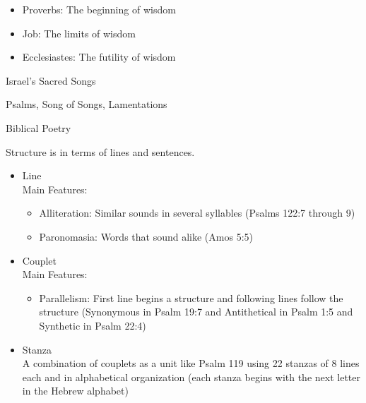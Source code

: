 \documentclass{article}
\begin{document}
    \begin{itemize}
        \item Proverbs: The beginning of wisdom
        \item Job: The limits of wisdom
        \item Ecclesiastes: The futility of wisdom
    \end{itemize}

    \centerline{Israel's Sacred Songs}

    Psalms, Song of Songs, Lamentations

    \centerline{Biblical Poetry}

    Structure is in terms of lines and sentences.

    \begin{itemize}
        \item Line \\
            Main Features: \\
                \begin{itemize}
                    \item Alliteration: Similar sounds in several syllables (Psalms 122:7 through 9)
                    \item Paronomasia: Words that sound alike (Amos 5:5)
                \end{itemize}
        \item Couplet \\
            Main Features: \\
                \begin{itemize}
                    \item Parallelism: First line begins a structure and following lines follow the structure (Synonymous in Psalm 19:7 and Antithetical in Psalm 1:5 and Synthetic in Psalm 22:4)
                \end{itemize}
        \item Stanza \\
            A combination of couplets as a unit like Psalm 119 using 22 stanzas of 8 lines each and in alphabetical organization (each stanza begins with the next letter in the Hebrew alphabet)
    \end{itemize}
\end{document}
